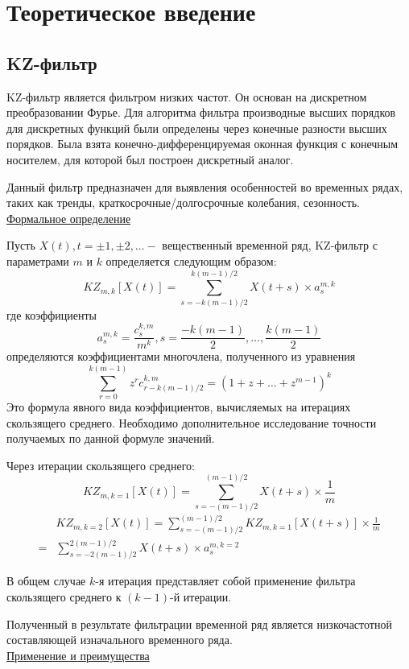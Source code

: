 \newpage
\section*{\centering Теоретическое введение}

\subsection*{KZ-фильтр}

KZ-фильтр является фильтром низких частот. Он основан на дискретном преобразовании Фурье. Для алгоритма фильтра производные высших порядков для дискретных функций были определены через конечные разности высших порядков. Была взята конечно-дифференцируемая оконная функция с конечным носителем, для которой был построен дискретный аналог.

Данный фильтр предназначен для выявления особенностей во временных рядах, таких как тренды, краткосрочные/долгосрочные колебания, сезонность.
\\
\underline{Формальное определение}

Пусть ${X(t)}, t = \pm 1,\pm 2, \dots -$ вещественный временной ряд, KZ-фильтр с параметрами $m$ и $k$ определяется следующим образом:
$$
KZ_{m,k}[X(t)]=\sum _{s=-k(m-1)/2}^{k(m-1)/2}{X(t+s)\times {a_{s}^{m,k}}}
$$
где коэффициенты
$$
a_{s}^{{m,k}}={\frac  {c_{s}^{{k,m}}}{m^{k}}},s={\frac  {-k(m-1)}{2}},\dots ,{\frac  {k(m-1)}{2}}
$$
определяются коэффициентами многочлена, полученного из уравнения
$$
\sum _{r=0}^{k(m-1)}{z^{r}c_{r-k(m-1)/2}^{k,m}=(1+z+\dots +z^{m-1})^{k}}
$$
Это формула явного вида коэффициентов, вычисляемых на итерациях скользящего среднего. Необходимо дополнительное исследование точности получаемых по данной формуле значений.


Через итерации скользящего среднего:
$$
KZ_{m,k=1}[X(t)]=\sum _{s=-(m-1)/2}^{(m-1)/2}{X(t+s)}\times {\frac {1}{m}}
$$
$$
{\begin{aligned}&KZ_{m,k=2}[X(t)]=\sum _{s=-(m-1)/2}^{(m-1)/2}{KZ_{m,k=1}[X(t+s)]\times {\frac {1}{m}}}\\={}&\sum _{s=-2(m-1)/2}^{2(m-1)/2}{X(t+s)\times {a_{s}^{m,k=2}}}\end{aligned}}
$$

В общем случае $k$-я итерация представляет собой применение фильтра скользящего среднего к $(k-1)$-й итерации.

Полученный в результате фильтрации временной ряд является низкочастотной составляющей изначального временного ряда.
\\
\underline{Применение и преимущества}

